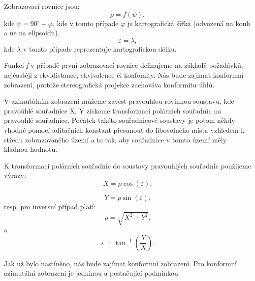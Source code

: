 Zobrazovací rovnice jsou:
\begin{equation}
\rho = f\left(\psi\right),
\end{equation}
kde $\psi = 90^{\circ}-\varphi$, kde v tomto případe $\varphi$ je kartografická šířka (odvozená na kouli a ne na elipsoidu).
\begin{equation}
\varepsilon = \lambda,
\end{equation}
kde $\lambda$ v tomto případe reprezentuje kartografickou délku.

Funkci \textit{f} v případě první zobrazovací rovnice definujeme na základě požadávků, nejčastěji z ekvidistance, ekvivalence či konfomity. Nás bude zajímat konformní zobrazení, protože stereografická projekce zachováva konformitu úhlů.

V azimutálním zobrazení můžeme zavést pravouhlou rovinnou soustavu, kde pravoúhlé souřadnice X, Y získame transformací polárních souřadníc na pravouhlé souřadnice. Počátek takéto souřadnicové soustavy je potom někdy vhodné pomocí aditačních konstant přesunout do libovolného místa vzhledem k středu zobrazovaného území a to tak, aby souřadnice v tomto území měly kladnou hodnotu.

K transformaci polárních souřadníc do soustavy pravouhlých souřadnic použijeme výrazy:
\begin{equation}
X = \rho \cos{\left(\varepsilon\right)},
\end{equation}

\begin{equation}
Y = \rho \sin{\left(\varepsilon\right)},
\end{equation}
resp. pro inversní případ platí:
\begin{equation}
\rho = \sqrt{X^{2} + Y^{2}},
\end{equation}
a
\begin{equation}
\varepsilon = \tan^{-1}{\left(\dfrac{Y}{X}\right)}.
\end{equation}

Jak už bylo nastíněno, nás bude zajímat konformní zobrazení. Pro  konformní azimutální zobrazení je jedninou a postačující podmínkou

